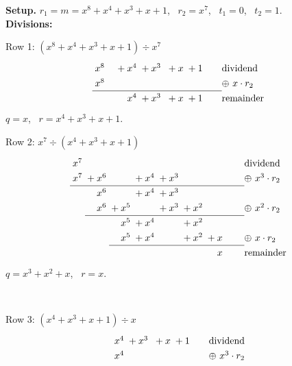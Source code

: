 \begin{worked}
\textbf{Setup.} $r_1 = m = x^8 + x^4 + x^3 + x + 1$, \ $r_2 = x^7$, \ $t_1 = 0$, \ $t_2 = 1$.\\[2pt]
\textbf{Divisions:}\\[2pt]
\begin{minipage}[t]{0.5\linewidth}
Row 1: $(x^8 + x^4 + x^3 + x + 1) \div x^7$
\[
\renewcommand{\arraystretch}{1.3}\begin{array}{@{}*{9}{@{\;}r}@{\qquad}l@{}}
x^{8} &  &  &  & {}+x^{4} & {}+x^{3} &  & {}+x & {}+1 & \text{dividend}\\
x^{8} &  &  &  &  &  &  &  &  & \oplus\ x\cdot r_2\\
\cline{1-9}
 &  &  &  & x^{4} & {}+x^{3} &  & {}+x & {}+1  & \text{remainder}\\
\end{array}
\]
$q = x$, \ $r = x^4 + x^3 + x + 1$.
\end{minipage}%
\begin{minipage}[t]{0.5\linewidth}
Row 2: $x^7 \div (x^4 + x^3 + x + 1)$
\[
\renewcommand{\arraystretch}{1.3}\begin{array}{@{}*{8}{@{\;}r}@{\qquad}l@{}}
x^{7} &  &  &  &  &  &  &  & \text{dividend}\\
x^{7} & {}+x^{6} &  & {}+x^{4} & {}+x^{3} &  &  &  & \oplus\ x^{3}\cdot r_2\\
\cline{1-8}
 & x^{6} &  & {}+x^{4} & {}+x^{3} &  &  &  & \\
 & x^{6} & {}+x^{5} &  & {}+x^{3} & {}+x^{2} &  &  & \oplus\ x^{2}\cdot r_2\\
\cline{2-8}
 &  & x^{5} & {}+x^{4} &  & {}+x^{2} &  &  & \\
 &  & x^{5} & {}+x^{4} &  & {}+x^{2} & {}+x &  & \oplus\ x\cdot r_2\\
\cline{3-8}
 &  &  &  &  &  & x &   & \text{remainder}\\
\end{array}
\]
$q = x^3 + x^2 + x$, \ $r = x$.
\end{minipage}\\[4pt]
\begin{minipage}[t]{0.5\linewidth}
Row 3: $(x^4 + x^3 + x + 1) \div x$
\[
\renewcommand{\arraystretch}{1.3}\begin{array}{@{}*{5}{@{\;}r}@{\qquad}l@{}}
x^{4} & {}+x^{3} &  & {}+x & {}+1 & \text{dividend}\\
x^{4} &  &  &  &  & \oplus\ x^{3}\cdot r_2\\

\end{array}\]
\end{minipage}
\end{worked}
